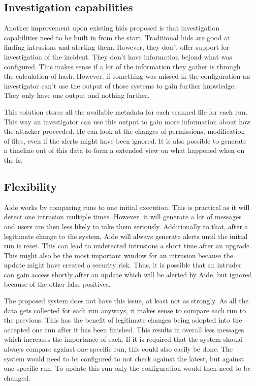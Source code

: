\documentclass[
	a4paper,					%
	10pt,							%
	twoside,					%
	openright,				%
	notitlepage,			%
	parskip=half,			%
]{scrreprt}					%
\begin{document}
\subsection{Investigation capabilities}
\label{sec:investigation:capabilities}
Another improvement upon existing \gls{hids} proposed is that investigation capabilities need to be built in from the start. Traditional \gls{hids} are good at finding intrusions and alerting them. However, they don't offer support for investigation of the incident. They don't have information bejond what was configured. This makes sense if a lot of the information they gather is through the calculation of \gls{hash}. However, if something was missed in the configuration an investigator can't use the output of those systems to gain further knowledge. They only have one output and nothing further.

This solution stores all the available \gls{metadata} for each scanned file for each run. This way an investigator can use this output to gain more information about how the attacker proceeded. He can look at the changes of permissions, modification of files, even if the alerts might have been ignored. It is also possible to generate a timeline out of this data to form a extended view on what happened when on the \gls{fs}. 

\subsection{Flexibility}

Aide works by comparing runs to one initial execution. This is practical as it will detect one intrusion multiple times. However, it will generate a lot of messages and users are then less likely to take them seriously. Additionally to that, after a legitimate change to the system, Aide will always generate alerts until the initial run is reset. This can lead to undetected intrusions a short time after an upgrade. This might also be the most important window for an intrusion because the update might have created a security risk. Thus, it is possible that an intruder can gain access shortly after an update which will be alerted by Aide, but ignored because of the other false positives.

The proposed system does not have this issue, at least not as strongly. As all the data gets collected for each run anyways, it makes sense to compare each run to the previous. This has the benefit of legitimate changes being adopted into the accepted one run after it has been finished. This results in overall less messages which increases the importance of each. If it is required that the system should always compare against one specific run, this could also easily be done. The system would need to be configured to not check against the latest, but against one specific run. To update this run only the configuration would then need to be changed. 
\end{document}
